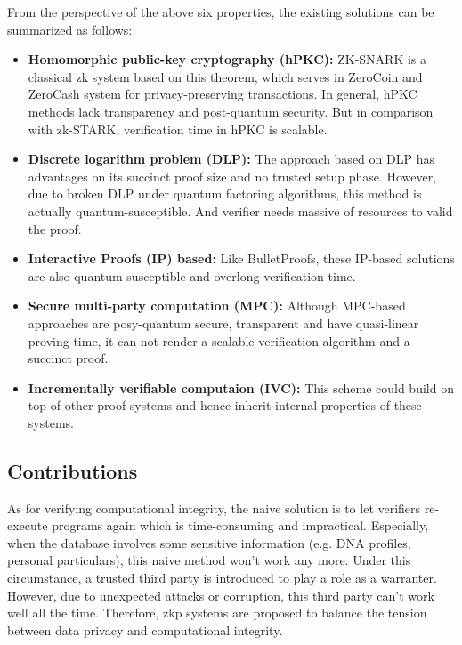 \documentclass[conference]{IEEEtran}
\begin{document}
From the perspective of the above six properties, the existing solutions can be summarized as follows:

\begin{itemize}
    \item \textbf{Homomorphic public-key cryptography (hPKC):} ZK-SNARK is a classical zk system based on this theorem, which serves in ZeroCoin \cite{miers2013zerocoin} and ZeroCash \cite{sasson2014zerocash} system for privacy-preserving transactions.
    In general, hPKC methods lack transparency and post-quantum security. But in comparison with zk-STARK, verification time in hPKC is scalable. 
    \item \textbf{Discrete logarithm problem (DLP):} The approach based on DLP has advantages on its succinct proof size and no trusted setup phase.
    However, due to broken DLP under quantum factoring algorithms, this method is actually quantum-susceptible. And verifier needs massive of resources to valid the proof.  
    \item \textbf{Interactive Proofs (IP) based:} Like BulletProofs, these IP-based solutions are also quantum-susceptible and overlong verification time.
    \item \textbf{Secure multi-party computation (MPC):} Although MPC-based approaches are posy-quantum secure, transparent and have quasi-linear proving time, it can not render a scalable verification algorithm and a succinct proof.
    \item \textbf{Incrementally verifiable computaion (IVC):} This scheme could build on top of other proof systems and hence inherit internal properties of these systems.
\end{itemize}

\subsection{Contributions}
As for verifying computational integrity, the naive solution is to let verifiers re-execute programs again which is time-consuming and impractical.
%
Especially, when the database involves some sensitive information (e.g. DNA profiles, personal particulars), this naive method won't work any more.
%
Under this circumstance, a trusted third party is introduced to play a role as a warranter.
%
However, due to unexpected attacks or corruption, this third party can't work well all the time.
%
Therefore, zkp systems are proposed to balance the tension between data privacy and computational integrity.
\end{document}

